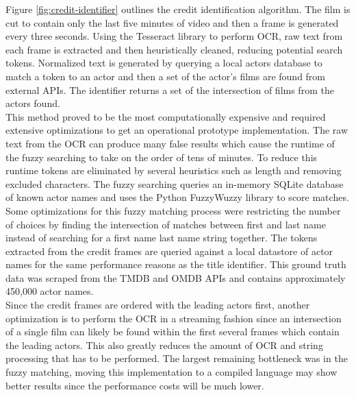\documentclass[paper=a4, fontsize=11pt]{scrartcl} %
\numberwithin{equation}{section} %
\numberwithin{figure}{section} %
\numberwithin{table}{section} %
\begin{document}
Figure \ref{fig:credit-identifier} outlines the credit identification algorithm. The film is cut to contain only the last five minutes of video and then a frame is generated every three seconds. Using the Tesseract library to perform OCR, raw text from each frame is extracted and then heuristically cleaned, reducing potential search tokens. Normalized text is generated by querying a local actors database to match a token to an actor and then a set of the actor's films are found from external APIs. The identifier returns a set of the intersection of films from the actors found. \\

This method proved to be the most computationally expensive and required extensive optimizations to get an operational prototype implementation. The raw text from the OCR can produce many false results which cause the runtime of the fuzzy searching to take on the order of tens of minutes. To reduce this runtime tokens are eliminated by several heuristics such as length and removing excluded characters. The fuzzy searching queries an in-memory SQLite database of known actor names and uses the Python FuzzyWuzzy library to score matches. \\

Some optimizations for this fuzzy matching process were restricting the number of choices by finding the intersection of matches between first and last name instead of searching for a first name last name string together. The tokens extracted from the credit frames are queried against a local datastore of actor names for the same performance reasons as the title identifier. This ground truth data was scraped from the TMDB and OMDB APIs and contains approximately 450,000 actor names. \\

Since the credit frames are ordered with the leading actors first, another optimization is to perform the OCR in a streaming fashion since an intersection of a single film can likely be found within the first several frames which contain the leading actors. This also greatly reduces the amount of OCR and string processing that has to be performed. The largest remaining bottleneck was in the fuzzy matching, moving this implementation to a compiled language may show better results since the performance costs will be much lower. \\
\end{document}
